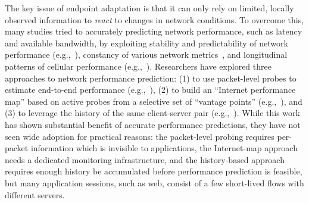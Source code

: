 The key issue of endpoint adaptation is that it can only rely 
on limited, locally observed information to {\em react} to
changes in network conditions.
To overcome this, many studies tried to accurately 
predicting network performance, such as latency and
available bandwidth, by exploiting
stability and predictability of network performance
(e.g.,~\cite{hu2005measurement}), constancy of various network
metrics~\cite{zhang2001constancy,balakrishnan1997analyzing}, 
and longitudinal patterns of cellular
performance (e.g.,~\cite{nikravesh2014mobile}).
%
Researchers have explored three approaches to network performance prediction:
(1) to use  packet-level probes to
estimate end-to-end performance 
(e.g.,~\cite{prasad2003bandwidth,
hu2004locating, strauss2003measurement, jain2003end}),
(2) to build an ``Internet performance map''
based on active probes from a selective set of 
``vantage points'' (e.g.,~\cite{madhyastha2006iplane, seshan1997spand,ramasubramanian2009treeness,
dabek2004vivaldi}), and 
(3) to leverage the
history of the  same client-server pair 
(e.g.,~\cite{vazhkudai2001predicting,
jain2005end, swany2002multivariate,
mirza2007machine, he2005predictability}).
While this work has shown substantial benefit of accurate performance
predictions, they have not seen wide adoption for practical 
reasons: the packet-level probing requires 
per-packet information which is invisible to applications,
the Internet-map approach needs a dedicated 
monitoring infrastructure, and the history-based approach requires
enough history be accumulated before performance prediction is 
feasible, but many application sessions, such as web, 
consist of a few short-lived flows with different servers.






